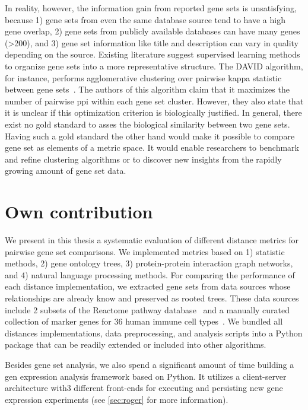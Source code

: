 \documentclass{thesisclass}
\begin{document}
In reality, however, the information gain from reported gene sets is unsatisfying, because 
1) gene sets from even the same database source tend to have a high gene overlap, 
2) gene sets from publicly available databases can have many genes (>200), and 
3) gene set information like title and description can vary in quality depending on the source.
Existing literature suggest supervised learning methods to organize gene sets into a more representative structure. The DAVID algorithm, for instance, performs agglomerative clustering over pairwise kappa statistic between gene sets~\cite{Huang2007}. The authors of this algorithm claim that it maximizes the number of pairwise \acrfull{ppi} within each gene set cluster. However, they also state that it is unclear if this optimization criterion is biologically justified. In general, there exist no gold standard to asses the biological similarity between two gene sets. Having such a gold standard the other hand would make it possible to compare gene set as elements of a metric space. It would enable researchers to benchmark and refine clustering algorithms or to discover new insights from the rapidly growing amount of gene set data.

\section{Own contribution}

We present in this thesis a systematic evaluation of different distance metrics for pairwise gene set comparisons. We implemented metrics based on 1) statistic methods, 2) gene ontology trees, 3) protein-protein interaction graph networks, and 4) natural language processing methods. For comparing the performance of each distance implementation, we extracted gene sets from data sources whose relationships are already know and preserved as rooted trees. These data sources include 2 subsets of the Reactome pathway database~\cite{doi:10.1093/nar/gki072} and a manually curated collection of marker genes for 36 human immune cell types~\cite{Sturm463828}. We bundled all distances implementations, data preprocessing, and analysis scripts into a Python package that can be readily extended or included into other algorithms.

Besides gene set analysis, we also spend a significant amount of time building a gen expression analysis framework based on Python. It utilizes a client-server architecture with3 different front-ends for executing and persisting new gene expression experiments (see \cref{sec:roger} for more information).
\end{document}
